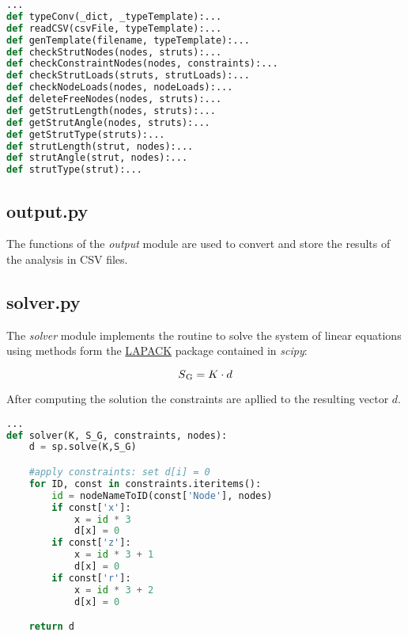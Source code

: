 \begin{inconsolata}
\begin{minipage}{\linewidth}
\begin{lstlisting}[language=python]
...
def typeConv(_dict, _typeTemplate):...
def readCSV(csvFile, typeTemplate):...
def genTemplate(filename, typeTemplate):...
def checkStrutNodes(nodes, struts):...
def checkConstraintNodes(nodes, constraints):...
def checkStrutLoads(struts, strutLoads):...
def checkNodeLoads(nodes, nodeLoads):...
def deleteFreeNodes(nodes, struts):...
def getStrutLength(nodes, struts):...
def getStrutAngle(nodes, struts):...
def getStrutType(struts):...
def strutLength(strut, nodes):...
def strutAngle(strut, nodes):...
def strutType(strut):...
\end{lstlisting}
\end{minipage}
\end{inconsolata}

\subsection{output.py}
\label{subsec:output.py}

The functions of the \textit{output} module are used to convert and store the results of the analysis in CSV files.

\subsection{solver.py}
\label{subsec:solver.py}

The \textit{solver} module implements the routine to solve the system of linear equations using methods form the \href{http://www.netlib.org/lapack/}{LAPACK} package contained in \textit{scipy}:

\begin{equation}
S\textsubscript{G} = K \cdot d
\end{equation}

After computing the solution the constraints are apllied to the resulting vector $d$.

\begin{inconsolata}
\begin{minipage}{\linewidth}
\begin{lstlisting}[language=python]
...
def solver(K, S_G, constraints, nodes):
    d = sp.solve(K,S_G)

    #apply constraints: set d[i] = 0
    for ID, const in constraints.iteritems():
        id = nodeNameToID(const['Node'], nodes)
        if const['x']:
            x = id * 3
            d[x] = 0
        if const['z']:
            x = id * 3 + 1
            d[x] = 0
        if const['r']:
            x = id * 3 + 2
            d[x] = 0

    return d
\end{lstlisting}
\end{minipage}
\end{inconsolata}

